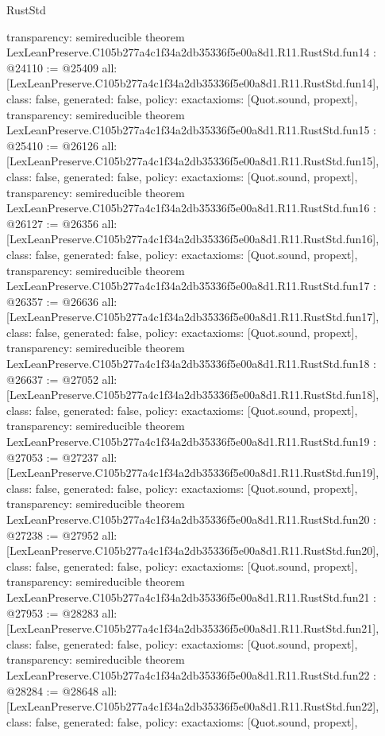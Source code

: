 \begin{lexlean}{RustStd}
\begin{coremodule}
{  transparency: semireducible
}
theorem LexLeanPreserve.C105b277a4c1f34a2db35336f5e00a8d1.R11.RustStd.fun14 : @24110 := @25409 {
  all: [LexLeanPreserve.C105b277a4c1f34a2db35336f5e00a8d1.R11.RustStd.fun14],
  class: false,
  generated: false,
  policy: exact{axioms: [Quot.sound, propext]},
  transparency: semireducible
}
theorem LexLeanPreserve.C105b277a4c1f34a2db35336f5e00a8d1.R11.RustStd.fun15 : @25410 := @26126 {
  all: [LexLeanPreserve.C105b277a4c1f34a2db35336f5e00a8d1.R11.RustStd.fun15],
  class: false,
  generated: false,
  policy: exact{axioms: [Quot.sound, propext]},
  transparency: semireducible
}
theorem LexLeanPreserve.C105b277a4c1f34a2db35336f5e00a8d1.R11.RustStd.fun16 : @26127 := @26356 {
  all: [LexLeanPreserve.C105b277a4c1f34a2db35336f5e00a8d1.R11.RustStd.fun16],
  class: false,
  generated: false,
  policy: exact{axioms: [Quot.sound, propext]},
  transparency: semireducible
}
theorem LexLeanPreserve.C105b277a4c1f34a2db35336f5e00a8d1.R11.RustStd.fun17 : @26357 := @26636 {
  all: [LexLeanPreserve.C105b277a4c1f34a2db35336f5e00a8d1.R11.RustStd.fun17],
  class: false,
  generated: false,
  policy: exact{axioms: [Quot.sound, propext]},
  transparency: semireducible
}
theorem LexLeanPreserve.C105b277a4c1f34a2db35336f5e00a8d1.R11.RustStd.fun18 : @26637 := @27052 {
  all: [LexLeanPreserve.C105b277a4c1f34a2db35336f5e00a8d1.R11.RustStd.fun18],
  class: false,
  generated: false,
  policy: exact{axioms: [Quot.sound, propext]},
  transparency: semireducible
}
theorem LexLeanPreserve.C105b277a4c1f34a2db35336f5e00a8d1.R11.RustStd.fun19 : @27053 := @27237 {
  all: [LexLeanPreserve.C105b277a4c1f34a2db35336f5e00a8d1.R11.RustStd.fun19],
  class: false,
  generated: false,
  policy: exact{axioms: [Quot.sound, propext]},
  transparency: semireducible
}
theorem LexLeanPreserve.C105b277a4c1f34a2db35336f5e00a8d1.R11.RustStd.fun20 : @27238 := @27952 {
  all: [LexLeanPreserve.C105b277a4c1f34a2db35336f5e00a8d1.R11.RustStd.fun20],
  class: false,
  generated: false,
  policy: exact{axioms: [Quot.sound, propext]},
  transparency: semireducible
}
theorem LexLeanPreserve.C105b277a4c1f34a2db35336f5e00a8d1.R11.RustStd.fun21 : @27953 := @28283 {
  all: [LexLeanPreserve.C105b277a4c1f34a2db35336f5e00a8d1.R11.RustStd.fun21],
  class: false,
  generated: false,
  policy: exact{axioms: [Quot.sound, propext]},
  transparency: semireducible
}
theorem LexLeanPreserve.C105b277a4c1f34a2db35336f5e00a8d1.R11.RustStd.fun22 : @28284 := @28648 {
  all: [LexLeanPreserve.C105b277a4c1f34a2db35336f5e00a8d1.R11.RustStd.fun22],
  class: false,
  generated: false,
  policy: exact{axioms: [Quot.sound, propext]},
}
\end{coremodule}
\end{lexlean}
